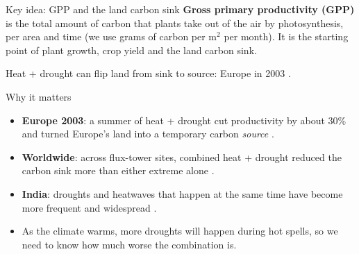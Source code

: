 \documentclass[11pt,aspectratio=169]{beamer}
\begin{document}
\begin{frame}{Key idea: GPP and the land carbon sink}
  \small
  \textbf{Gross primary productivity (GPP)} is the total amount of carbon that
  plants take out of the air by photosynthesis, per area and time (we use grams
  of carbon per m$^2$ per month). It is the starting point of plant growth, crop
  yield and the land carbon sink.

  \vspace{4pt}
  \centering

  \vspace{2pt}
  \footnotesize Heat + drought can flip land from sink to source: Europe in 2003
  \citep{ciais2005}.
\end{frame}

\begin{frame}{Why it matters}
  \begin{itemize}
    \item \textbf{Europe 2003}: a summer of heat + drought cut productivity by
      about 30\% and turned Europe's land into a temporary carbon
      \emph{source} \citep{ciais2005}.
    \item \textbf{Worldwide}: across flux-tower sites, combined heat + drought
      reduced the carbon sink more than either extreme alone
      \citep{vonbuttlar2018}.
    \item \textbf{India}: droughts and heatwaves that happen at the same time
      have become more frequent and widespread \citep{sharma2017}.
    \item As the climate warms, more droughts will happen during hot spells,
      so we need to know how much worse the combination is.
  \end{itemize}
\end{frame}
\end{document}
